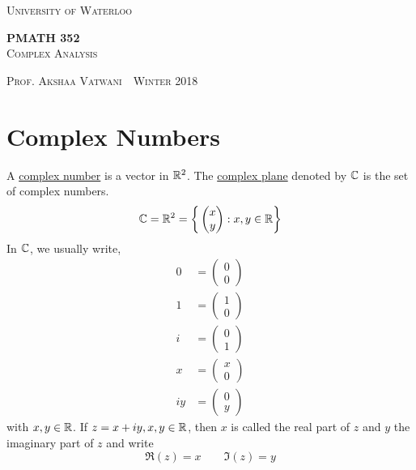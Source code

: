 \documentclass[11pt]{article}
\newcommand{\thiscoursecode}{PMATH 352}
\newcommand{\thiscoursename}{Complex Analysis}
\newcommand{\thisprof}{Prof. Akshaa Vatwani}
\newcommand{\thisterm}{Winter 2018}
\begin{document}
\begin{titlepage}
	\begin{centering}
		{\scshape\LARGE University of Waterloo \par}
		\globe
		{\huge\bf \thiscoursecode}\\
		{\scshape\Large \thiscoursename}\\
		\vspace{.3cm}
		{\scshape \thisprof~\textbullet~\thisterm \par}
	\end{centering}
	\sectionline
	\tableofcontents
	\sectionline
	\thispagestyle{empty}
\end{titlepage}

\section{Complex Numbers}
\begin{definition}
	A \underline{complex number} is a vector in $\mathbb{R}^2$. The \underline{complex
	plane} denoted by $\mathbb{C}$ is the set of complex numbers.
	\begin{equation*}
		\mathbb{C} = \mathbb{R}^2 = \bigg\{\begin{pmatrix}x\\y\end{pmatrix}: x, y \in \mathbb{R} \bigg\}
	\end{equation*}
	In $\mathbb{C}$, we usually write,
	\begin{align*}
		0 &= \begin{pmatrix}0\\0\end{pmatrix}\\
		1 &= \begin{pmatrix}1\\0\end{pmatrix}\\
		i &= \begin{pmatrix}0\\1\end{pmatrix}\\
		x &= \begin{pmatrix}x\\0\end{pmatrix}\\
		iy &= \begin{pmatrix}0\\y\end{pmatrix}
	\end{align*}
	with $x, y \in \mathbb{R}$. If $z = x + iy, x, y \in \mathbb{R}$, then $x$ is called the
	real part of $z$ and $y$ the imaginary part of $z$ and write
	\begin{equation*}
		\Re(z) = x \qquad \Im(z) = y
	\end{equation*}
\end{definition}
\end{document}
